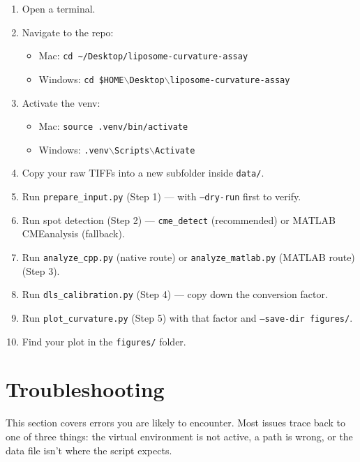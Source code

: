 \documentclass[11pt]{article}
\newcommand{\code}[1]{\texttt{#1}}
\begin{document}
\begin{enumerate}[leftmargin=*]
    \item Open a terminal.
    \item Navigate to the repo:

    \begin{itemize}
        \item Mac: \code{cd \textasciitilde/Desktop/liposome-curvature-assay}
        \item Windows: \code{cd \$HOME$\backslash$Desktop$\backslash$liposome-curvature-assay}
    \end{itemize}

    \item Activate the venv:

    \begin{itemize}
        \item Mac: \code{source .venv/bin/activate}
        \item Windows: \code{.venv$\backslash$Scripts$\backslash$Activate}
    \end{itemize}

    \item Copy your raw TIFFs into a new subfolder inside
    \code{data/}.
    \item Run \code{prepare\_input.py} (Step 1) --- with
    \code{--dry-run} first to verify.
    \item Run spot detection (Step 2) --- \code{cme\_detect}
    (recommended) or MATLAB CMEanalysis (fallback).
    \item Run \code{analyze\_cpp.py} (native route) or
    \code{analyze\_matlab.py} (MATLAB route) (Step 3).
    \item Run \code{dls\_calibration.py} (Step 4) --- copy down the
    conversion factor.
    \item Run \code{plot\_curvature.py} (Step 5) with that factor and
    \code{--save-dir figures/}.
    \item Find your plot in the \code{figures/} folder.
\end{enumerate}

\section{Troubleshooting}

This section covers errors you are likely to encounter. Most issues
trace back to one of three things: the virtual environment is not
active, a path is wrong, or the data file isn't where the script
expects.
\end{document}
